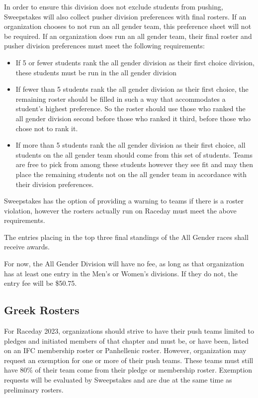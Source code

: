 In order to ensure this division does not exclude students from pushing, Sweepstakes will also collect pusher division preferences with final rosters. If an organization chooses to not run an all gender team, this preference sheet will not be required. If an organization does run an all gender team, their final roster and pusher division preferences must meet the following requirements: 
\begin{itemize}
    \item If 5 or fewer students rank the all gender division as their first choice division, these students must be run in the all gender division 
    \item If fewer than 5 students rank the all gender division as their first choice, the remaining roster should be filled in such a way that accommodates a student's highest preference. So the roster should use those who ranked the all gender division second before those who ranked it third, before those who chose not to rank it. 
    \item If more than 5 students rank the all gender division as their first choice, all students on the all gender team should come from this set of students. Teams are free to pick from among these students however they see fit and may then place the remaining students not on the all gender team in accordance with their division preferences. 
\end{itemize}


Sweepstakes has the option of providing a warning to teams if there is a roster violation, however the rosters actually run on Raceday must meet the above requirements. 

The entries placing in the top three final standings of the All Gender races shall receive awards. 

For now, the All Gender Division will have no fee, as long as that organization has at least one entry in the Men's or Women's divisions. If they do not, the entry fee will be \$50.75. 

\subsection*{Greek Rosters} \label{Greek}
For Raceday 2023, organizations should strive to have their push teams limited to pledges and initiated members of that chapter and must be, or have been, listed on an IFC membership roster or Panhellenic roster. However, organization may request an exemption for one or more of their push teams. These teams must still have 80\% of their team come from their pledge or membership roster. Exemption requests will be evaluated by Sweepstakes and are due at the same time as preliminary rosters. 

